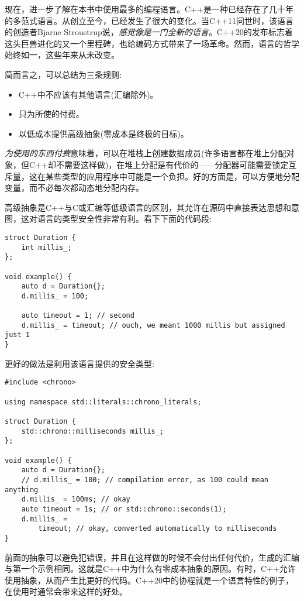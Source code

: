 
现在，进一步了解在本书中使用最多的编程语言。C++是一种已经存在了几十年的多范式语言。从创立至今，已经发生了很大的变化。当C++11问世时，该语言的创造者Bjarne Stroustrup说，\textit{感觉像是一门全新的语言}。C++20的发布标志着这头巨兽进化的又一个里程碑，也给编码方式带来了一场革命。然而，语言的哲学始终如一，这些年来从未改变。

简而言之，可以总结为三条规则:

\begin{itemize}
\item C++中不应该有其他语言(汇编除外)。
\item 只为所使的付费。
\item 以低成本提供高级抽象(零成本是终极的目标)。
\end{itemize}

\textit{为使用的东西付费}意味着，可以在堆栈上创建数据成员(许多语言都在堆上分配对象，但C++却不需要这样做)，在堆上分配是有代价的——分配器可能需要锁定互斥量，这在某些类型的应用程序中可能是一个负担。好的方面是，可以方便地分配变量，而不必每次都动态地分配内存。

高级抽象是C++与C或汇编等低级语言的区别，其允许在源码中直接表达思想和意图，这对语言的类型安全性非常有利。看下下面的代码段:

\begin{lstlisting}[style=styleCXX]
struct Duration {
	int millis_;
};

void example() {
	auto d = Duration{};
	d.millis_ = 100;
	
	auto timeout = 1; // second
	d.millis_ = timeout; // ouch, we meant 1000 millis but assigned just 1
}

\end{lstlisting}

更好的做法是利用该语言提供的安全类型:

\begin{lstlisting}[style=styleCXX]
#include <chrono>

using namespace std::literals::chrono_literals;

struct Duration {
	std::chrono::milliseconds millis_;
};

void example() {
	auto d = Duration{};
	// d.millis_ = 100; // compilation error, as 100 could mean anything
	d.millis_ = 100ms; // okay
	auto timeout = 1s; // or std::chrono::seconds(1);
	d.millis_ =
		timeout; // okay, converted automatically to milliseconds
}
\end{lstlisting}

前面的抽象可以避免犯错误，并且在这样做的时候不会付出任何代价，生成的汇编与第一个示例相同。这就是C++中为什么有零成本抽象的原因。有时，C++允许使用抽象，从而产生比更好的代码。C++20中的协程就是一个语言特性的例子，在使用时通常会带来这样的好处。

